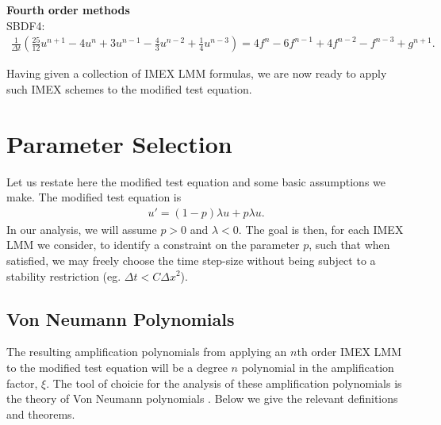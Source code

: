 \noindent
\textbf{Fourth order methods}\\
SBDF4:
\begin{align}
\frac{1}{\Delta t}\left(\frac{25}{12}u^{n+1} - 4u^n + 3u^{n-1} - \frac{4}{3}u^{n-2} + \frac{1}{4}u^{n-3} \right) 
= 4f^n - 6f^{n-1} + 4f^{n-2} -f^{n-3} + g^{n+1}.
\label{sbdf4}
\end{align}

Having given a collection of IMEX LMM formulas, we are now ready to apply such IMEX schemes to the modified test equation.

\section{Parameter Selection}
Let us restate here the modified test equation and some basic assumptions we make.
The modified test equation is 
\begin{align*}
        u' =  (1-p)\lambda u + p\lambda u.
\label{mtee}
\end{align*}
In our analysis, we will assume $p>0$ and $\lambda < 0$. The goal is then, for each IMEX LMM we consider, to identify a constraint on the parameter $p$, such that when satisfied, we may freely choose the time step-size without being subject to a stability restriction (eg. $\Delta t < C\Delta x^2$).

\subsection{Von Neumann Polynomials}
The resulting amplification polynomials from applying an $n$th order IMEX LMM to the modified test equation will be a degree $n$ polynomial in the amplification factor, $\xi$. The tool of choicie for the analysis of these amplification polynomials is the theory of Von Neumann polynomials \cite[Chapter 4]{strikwerda2004finite}. Below we give the relevant definitions and theorems.

